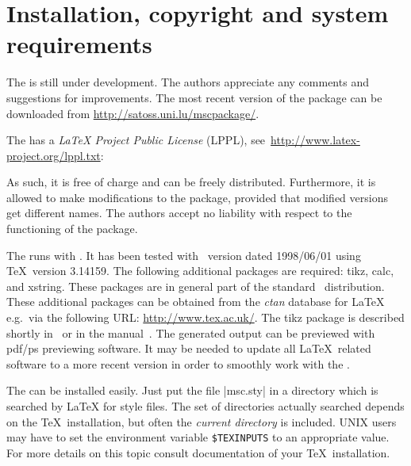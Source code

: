 \documentclass[12pt,a4paper]{article}
\begin{document}
\section{Installation, copyright and system requirements}
\label{install}

The \mscpack{} is still under development. The authors
appreciate any comments and suggestions for improvements. The most
recent version of the package can be downloaded from
\url{http://satoss.uni.lu/mscpackage/}.


The \mscpack{} has a \emph{LaTeX Project Public License}
(LPPL), see~\url{http://www.latex-project.org/lppl.txt}:
{\small

} As such, it is free of charge and can be freely
distributed. Furthermore, it is allowed to make modifications to the
package, provided that modified versions get different names.  The
authors accept no liability with respect to the functioning of the
package.

The \mscpack{} runs with \LaTeXe. It has been tested with \LaTeXe\
version dated 1998/06/01 using \TeX\ version 3.14159.  The following
additional packages are required: \textsf{tikz}, \textsf{calc},
and \textsf{xstring}.  These packages are in general
part of the standard \LaTeXe\ distribution. These additional packages
can be obtained from the {\em ctan} database for \LaTeX\, e.g.\ via
the following URL: \url{http://www.tex.ac.uk/}. The \textsf{tikz}
package is described shortly in~\cite{mertz2007graphics} or in the \pgfname
manual~\cite{tantau2022pgf}.
The generated output can be previewed with pdf/ps previewing software.
It may be needed to update all \LaTeX\ related software
to a more recent version in order to smoothly work with the \mscpack.

The \mscpack{} can be installed easily. Just put the file
|msc.sty| in a directory which is searched by \LaTeX{} for style
files. The set of directories actually searched depends on the \TeX\
installation, but often the {\em current directory} is included. UNIX
users may have to set the environment variable \texttt{\$TEXINPUTS} to
an appropriate value.  For more details on this topic consult
documentation of your \TeX\ installation.

%
\end{document}

